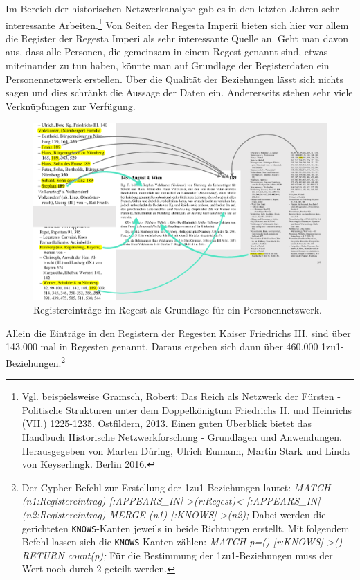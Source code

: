 \documentclass[ngerman,]{scrreprt}
\begin{document}
Im Bereich der historischen Netzwerkanalyse gab es in den letzten Jahren sehr interessante Arbeiten.\footnote{Vgl. beispielsweise Gramsch, Robert: Das Reich als Netzwerk der Fürsten - Politische Strukturen unter dem Doppelkönigtum Friedrichs II. und Heinrichs (VII.) 1225-1235. Ostfildern, 2013. Einen guten Überblick bietet das Handbuch Historische Netzwerkforschung - Grundlagen und Anwendungen. Herausgegeben von Marten Düring, Ulrich Eumann, Martin Stark und Linda von Keyserlingk. Berlin 2016.} Von Seiten der Regesta Imperii bieten sich hier vor allem die Register der Regesta Imperi als sehr interessante Quelle an. Geht man davon aus, dass alle Personen, die gemeinsam in einem Regest genannt sind, etwas miteinander zu tun haben, könnte man auf Grundlage der Registerdaten ein Personennetzwerk erstellen. Über die Qualität der Beziehungen lässt sich nichts sagen und dies schränkt die Aussage der Daten ein. Andererseits stehen sehr viele Verknüpfungen zur Verfügung.

\begin{figure}
\centering
\includegraphics{Bilder/Register-und-Regest-19-189.png}
\caption{Registereinträge im Regest als Grundlage für ein Personennetzwerk.}
\end{figure}

Allein die Einträge in den Registern der Regesten Kaiser Friedrichs III. sind über 143.000 mal in Regesten genannt. Daraus ergeben sich dann über 460.000 1zu1-Beziehungen.\footnote{Der Cypher-Befehl zur Erstellung der 1zu1-Beziehungen lautet: \emph{MATCH (n1:Registereintrag)-{[}:APPEARS\_IN{]}-\textgreater{}(r:Regest)\textless{}-{[}:APPEARS\_IN{]}-(n2:Registereintrag) MERGE (n1)-{[}:KNOWS{]}-\textgreater{}(n2);} Dabei werden die gerichteten \texttt{KNOWS}-Kanten jeweils in beide Richtungen erstellt. Mit folgendem Befehl lassen sich die \texttt{KNOWS}-Kanten zählen: \emph{MATCH p=()-{[}r:KNOWS{]}-\textgreater{}() RETURN count(p);} Für die Bestimmung der 1zu1-Beziehungen muss der Wert noch durch 2 geteilt werden.}
\end{document}
